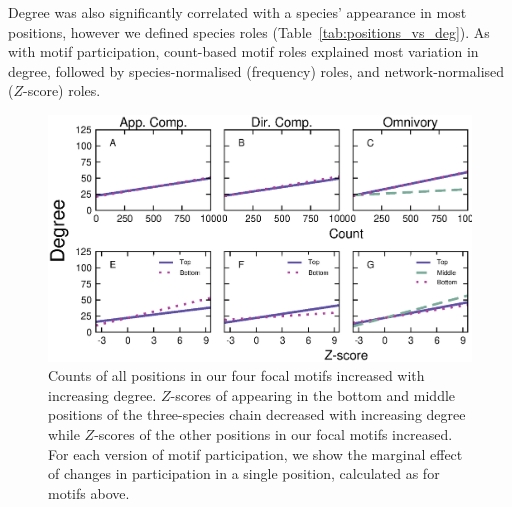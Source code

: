 \documentclass[12pt]{article}
\begin{document}
\begin{spacing}{2.0}
            Degree was also significantly correlated with a species' appearance in most positions, however we defined species roles (Table~\ref{tab:positions_vs_deg}).
            As with motif participation, count-based motif roles explained most variation in degree, followed by species-normalised (frequency) roles, and network-normalised ($Z$-score) roles.


		    \begin{figure}[ht!]
		        \centering
		        \includegraphics[width=\textwidth]{figures/positions_vs_Deg_countZ.eps}
		        \caption{Counts of all positions in our four focal motifs increased with increasing degree. $Z$-scores of appearing in the bottom and middle positions of the three-species chain decreased with increasing degree while $Z$-scores of the other positions in our focal motifs increased. For each version of motif participation, we show the marginal effect of changes in participation in a single position, calculated as for motifs above.}
		        \label{fig:positions_deg}
		    \end{figure}



\end{spacing}
\end{document}
